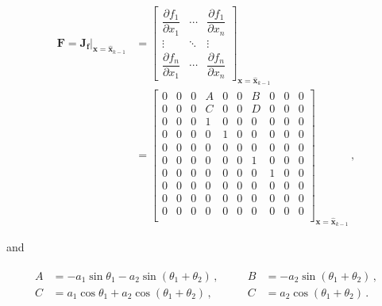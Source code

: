 \begin{equation}
\begin{split}
\mathbf{F} = \mathbf{J}_{\mathbf{f}} |_{\mathbf{x}=\hat{\mathbf{x}}_{k-1}} &= \begin{bmatrix}
    \dfrac{\partial f_1}{\partial x_1} & \cdots & \dfrac{\partial f_1}{\partial x_{n}}\\
    \vdots & \ddots & \vdots\\
    \dfrac{\partial f_{n}}{\partial x_1} & \cdots & \dfrac{\partial f_{n}}{\partial x_{n}} \end{bmatrix}_{\mathbf{x}=\hat{\mathbf{x}}_{k-1}} \\
&=\begin{bmatrix}
  0 & 0 & 0 & A & 0 & 0 & B & 0 & 0 & 0\\
  0 & 0 & 0 & C & 0 & 0 & D & 0 & 0 & 0\\
  0 & 0 & 0 & 1 & 0 & 0 & 0 & 0 & 0 & 0\\
  0 & 0 & 0 & 0 & 1 & 0 & 0 & 0 & 0 & 0\\
  0 & 0 & 0 & 0 & 0 & 0 & 0 & 0 & 0 & 0\\
  0 & 0 & 0 & 0 & 0 & 0 & 1 & 0 & 0 & 0\\
  0 & 0 & 0 & 0 & 0 & 0 & 0 & 1 & 0 & 0\\
  0 & 0 & 0 & 0 & 0 & 0 & 0 & 0 & 0 & 0\\
  0 & 0 & 0 & 0 & 0 & 0 & 0 & 0 & 0 & 0\\
  0 & 0 & 0 & 0 & 0 & 0 & 0 & 0 & 0 & 0\\
\end{bmatrix}_{\mathbf{x}=\hat{\mathbf{x}}_{k-1}}\,,
\end{split}
\end{equation}

\noindent
and

\begin{equation*}
  \begin{array}{cc}
  \begin{split}
  	A &= -a_1 \sin \theta_1 -a_2 \sin (\theta_1 + \theta_2)\,, \quad \\
  	C &= a_1 \cos \theta_1 + a_2 \cos (\theta_1 + \theta_2)\,,
  \end{split} &
  \begin{split}
  B &= -a_2 \sin (\theta_1 + \theta_2)\,, \\
  C &= a_2 \cos (\theta_1 + \theta_2)\,.
  \end{split}
\end{array}
\end{equation*}


